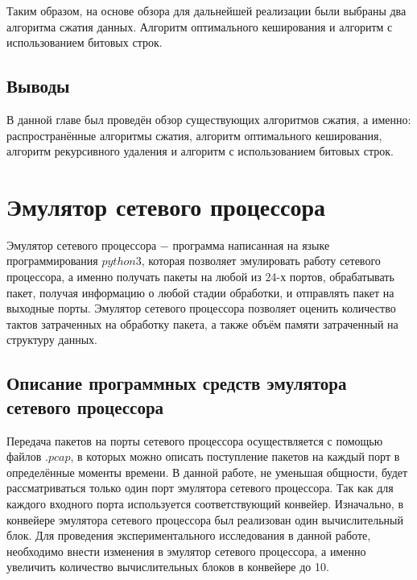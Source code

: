 \documentclass[a4paper, 12pt, titlepage, finall]{extreport}
\begin{document}
        Таким образом, на основе обзора для дальнейшей реализации были выбраны два алгоритма сжатия данных. Алгоритм оптимального кеширования и алгоритм с использованием битовых строк.

        \section{Выводы}
        В данной главе был проведён обзор существующих алгоритмов сжатия, а именно: распространённые алгоритмы сжатия, алгоритм оптимального кеширования, алгоритм рекурсивного удаления 
        и алгоритм с использованием битовых строк.
    \chapter{Эмулятор сетевого процессора}
        Эмулятор сетевого процессора $-$ программа написанная на языке программирования $python3$, которая позволяет эмулировать работу сетевого процессора, 
        а именно получать пакеты на любой из 24-х портов, обрабатывать пакет, получая информацию о любой стадии обработки, и отправлять пакет на выходные порты.
        Эмулятор сетевого процессора позволяет оценить количество тактов затраченных на обработку пакета, а также объём памяти затраченный на структуру данных.

        \section{Описание программных средств эмулятора сетевого процессора}
            Передача пакетов на порты сетевого процессора осуществляется с помощью файлов $.pcap$, в которых можно описать поступление пакетов на каждый порт в определённые моменты времени.
            В данной работе, не уменьшая общности, будет рассматриваться только один порт эмулятора сетевого процессора. Так как для каждого входного
            порта используется соответствующий конвейер. Изначально, в конвейере эмулятора сетевого процессора был реализован один вычислительный блок.
            Для проведения экспериментального исследования в данной работе, необходимо внести изменения в эмулятор сетевого процессора, а именно увеличить количество вычислительных блоков 
            в конвейере до 10.
\end{document}
